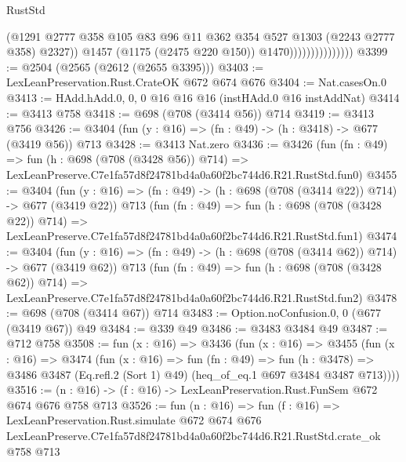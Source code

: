 \begin{lexlean}{RustStd}
\begin{coremodule}
                                    (@1291
                                      @2777
                                      @358
                                      @105
                                      @83
                                      @96
                                      @11
                                      @362
                                      @354
                                      @527
                                      @1303
                                      (@2243 @2777 @358)
                                      @2327))
                                  @1457
                                  (@1175 (@2475 @220 @150))
                                  @1470)))))))))))))))
@3399 := @2504 (@2565 (@2612 (@2655 @3395)))
@3403 := LexLeanPreservation.Rust.CrateOK @672 @674 @676
@3404 := Nat.casesOn.{0}
@3413 := HAdd.hAdd.{0, 0, 0} @16 @16 @16 (instHAdd.{0} @16 instAddNat)
@3414 := @3413 @758
@3418 := @698 (@708 (@3414 @56)) @714
@3419 := @3413 @756
@3426 := @3404 (fun (y : @16) => (fn : @49) -> (h : @3418) -> @677 (@3419 @56)) @713
@3428 := @3413 Nat.zero
@3436 := @3426
    (fun (fn : @49) =>
    fun (h : @698 (@708 (@3428 @56)) @714) =>
    LexLeanPreserve.C7e1fa57d8f24781bd4a0a60f2bc744d6.R21.RustStd.fun0)
@3455 := @3404
    (fun (y : @16) => (fn : @49) -> (h : @698 (@708 (@3414 @22)) @714) -> @677 (@3419 @22))
    @713
    (fun (fn : @49) =>
    fun (h : @698 (@708 (@3428 @22)) @714) =>
    LexLeanPreserve.C7e1fa57d8f24781bd4a0a60f2bc744d6.R21.RustStd.fun1)
@3474 := @3404
    (fun (y : @16) => (fn : @49) -> (h : @698 (@708 (@3414 @62)) @714) -> @677 (@3419 @62))
    @713
    (fun (fn : @49) =>
    fun (h : @698 (@708 (@3428 @62)) @714) =>
    LexLeanPreserve.C7e1fa57d8f24781bd4a0a60f2bc744d6.R21.RustStd.fun2)
@3478 := @698 (@708 (@3414 @67)) @714
@3483 := Option.noConfusion.{0, 0} (@677 (@3419 @67)) @49
@3484 := @339 @49
@3486 := @3483 @3484 @49
@3487 := @712 @758
@3508 := fun (x : @16) =>
  @3436
    (fun (x : @16) =>
    @3455
      (fun (x : @16) =>
      @3474
        (fun (x : @16) =>
        fun (fn : @49) =>
        fun (h : @3478) =>
        @3486 @3487 (Eq.refl.{2} (Sort 1) @49) (heq_of_eq.{1} @697 @3484 @3487 @713))))
@3516 := (n : @16) -> (f : @16) -> LexLeanPreservation.Rust.FunSem @672 @674 @676 @758 @713
@3526 := fun (n : @16) =>
  fun (f : @16) =>
  LexLeanPreservation.Rust.simulate
    @672
    @674
    @676
    LexLeanPreserve.C7e1fa57d8f24781bd4a0a60f2bc744d6.R21.RustStd.crate_ok
    @758
    @713
\end{coremodule}
\end{lexlean}
